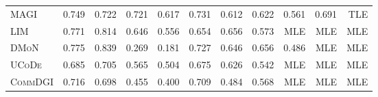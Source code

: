 \documentclass[11pt,a4paper]{article}
\begin{document}
\begin{table}[H]
\begin{tabular*}{\textwidth}{@{\extracolsep{\fill}}l rrrrrrrrrr@{}}
        \textsc{MAGI} & 0.749 & 0.722 & 0.721 & 0.617 & 0.731 & 0.612 & 0.622 & 0.561 & 0.691 & TLE \\
        \textsc{LIM} & 0.771 & 0.814 & 0.646 & 0.556 & 0.654 & 0.656 & 0.573 & MLE & MLE & MLE \\
        \textsc{DMoN} & 0.775 & 0.839 & 0.269 & 0.181 & 0.727 & 0.646 & 0.656 & 0.486 & MLE & MLE \\
        \textsc{UCoDe} & 0.685 & 0.705 & 0.565 & 0.504 & 0.675 & 0.626 & 0.542 & MLE & MLE & MLE \\
        \textsc{CommDGI} & 0.716 & 0.698 & 0.455 & 0.400 & 0.709 & 0.484 & 0.568 & MLE & MLE & MLE \\
        \bottomrule
    \end{tabular*}
\end{table}
\end{document}
